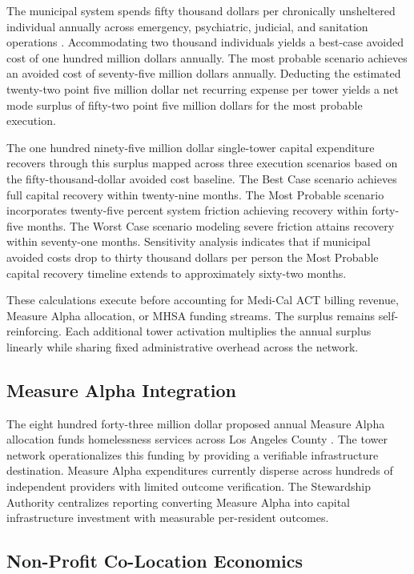 \documentclass[12pt, letterpaper]{article}
\begin{document}
The municipal system spends fifty thousand dollars per chronically unsheltered individual annually across emergency, psychiatric, judicial, and sanitation operations \citep{calmatters_2026}. Accommodating two thousand individuals yields a best-case avoided cost of one hundred million dollars annually. The most probable scenario achieves an avoided cost of seventy-five million dollars annually. Deducting the estimated twenty-two point five million dollar net recurring expense per tower yields a net mode surplus of fifty-two point five million dollars for the most probable execution. 

The one hundred ninety-five million dollar single-tower capital expenditure recovers through this surplus mapped across three execution scenarios based on the fifty-thousand-dollar avoided cost baseline. The Best Case scenario achieves full capital recovery within twenty-nine months. The Most Probable scenario incorporates twenty-five percent system friction achieving recovery within forty-five months. The Worst Case scenario modeling severe friction attains recovery within seventy-one months. Sensitivity analysis indicates that if municipal avoided costs drop to thirty thousand dollars per person the Most Probable capital recovery timeline extends to approximately sixty-two months.

These calculations execute before accounting for Medi-Cal ACT billing revenue, Measure Alpha allocation, or MHSA funding streams. The surplus remains self-reinforcing. Each additional tower activation multiplies the annual surplus linearly while sharing fixed administrative overhead across the network.

\subsection{Measure Alpha Integration}

The eight hundred forty-three million dollar proposed annual Measure Alpha allocation funds homelessness services across Los Angeles County \citep{lac_ceo_measure_a_2025, lac_homeless_initiative_2025}. The tower network operationalizes this funding by providing a verifiable infrastructure destination. Measure Alpha expenditures currently disperse across hundreds of independent providers with limited outcome verification. The Stewardship Authority centralizes reporting converting Measure Alpha into capital infrastructure investment with measurable per-resident outcomes.

\subsection{Non-Profit Co-Location Economics}
\end{document}
